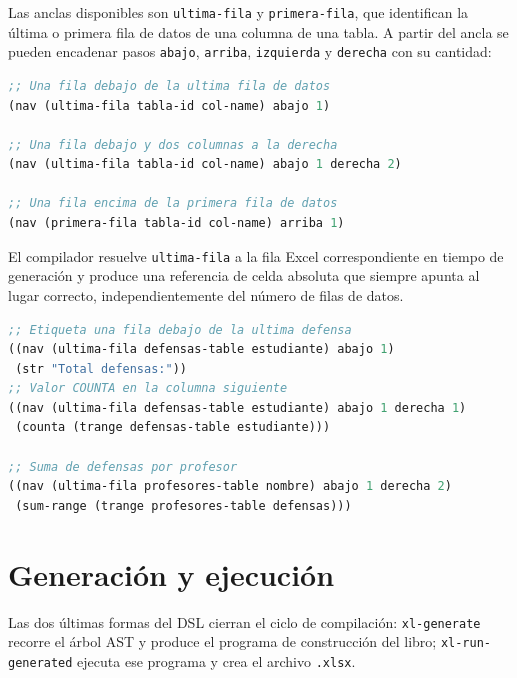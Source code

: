 \documentclass[12pt,a4paper]{report}
\begin{document}
Las anclas disponibles son \texttt{ultima-fila} y \texttt{primera-fila},
que identifican la \'ultima o primera fila de datos de una columna de una
tabla.  A partir del ancla se pueden encadenar pasos \texttt{abajo},
\texttt{arriba}, \texttt{izquierda} y \texttt{derecha} con su cantidad:

\begin{lstlisting}[language=CommonLisp,
  caption={Sintaxis de nav y anclas de tabla.}]
;; Una fila debajo de la ultima fila de datos
(nav (ultima-fila tabla-id col-name) abajo 1)

;; Una fila debajo y dos columnas a la derecha
(nav (ultima-fila tabla-id col-name) abajo 1 derecha 2)

;; Una fila encima de la primera fila de datos
(nav (primera-fila tabla-id col-name) arriba 1)
\end{lstlisting}

El compilador resuelve \texttt{ultima-fila} a la fila Excel correspondiente
en tiempo de generaci\'on y produce una referencia de celda absoluta que
siempre apunta al lugar correcto, independientemente del n\'umero de filas
de datos.

\begin{lstlisting}[language=CommonLisp,
  caption={Expresiones fijas de totales con posicionamiento relativo.}]
;; Etiqueta una fila debajo de la ultima defensa
((nav (ultima-fila defensas-table estudiante) abajo 1)
 (str "Total defensas:"))
;; Valor COUNTA en la columna siguiente
((nav (ultima-fila defensas-table estudiante) abajo 1 derecha 1)
 (counta (trange defensas-table estudiante)))

;; Suma de defensas por profesor
((nav (ultima-fila profesores-table nombre) abajo 1 derecha 2)
 (sum-range (trange profesores-table defensas)))
\end{lstlisting}

\section{Generaci\'on y ejecuci\'on}
\label{sec:generacion}

Las dos \'ultimas formas del DSL cierran el ciclo de compilaci\'on:
\texttt{xl-generate} recorre el \'arbol AST y produce el programa de
construcci\'on del libro; \texttt{xl-run-generated} ejecuta ese programa
y crea el archivo \texttt{.xlsx}.
\end{document}

